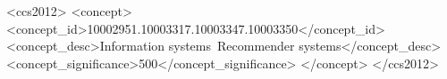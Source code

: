 \documentclass[acmsmall]{acmart}
\begin{document}



\renewcommand{\shortauthors}{Zhao, et al.}





\begin{CCSXML}
<ccs2012>
<concept>
<concept_id>10002951.10003317.10003347.10003350</concept_id>
<concept_desc>Information systems~Recommender systems</concept_desc>
<concept_significance>500</concept_significance>
</concept>
</ccs2012>
\end{CCSXML}



\maketitle




















\end{document}
